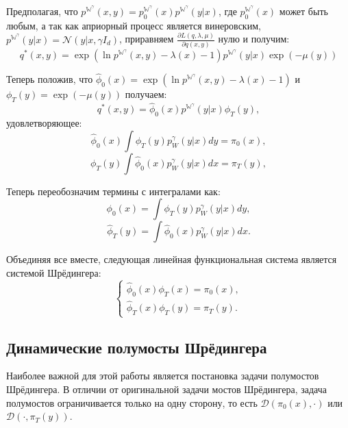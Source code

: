 Предполагая, что $p^{\mathbb{W}^\gamma}(x,y) = p_0^{\mathbb{W}^\gamma}(x)p^{\mathbb{W}^\gamma}(y|x)$, где $p_0^{\mathbb{W}^\gamma}(x)$ может быть любым, а так как априорный процесс является винеровским, $p^{\mathbb{W}^\gamma}(y|x)=\mathcal{N}(y|x, \gamma I_d)$, приравняем $\frac{\partial L(q, \lambda, \mu)}{\partial q(x,y)}$ нулю и получим:
\begin{equation*}
    q^*(x, y) = \exp{(\ln{p^{\mathbb{W}^\gamma}(x,y)} - \lambda(x) - 1)}p^{\mathbb{W}^\gamma}(y|x)\exp{(-\mu(y))}
\end{equation*}

Теперь положив, что  $\hat\phi_0(x) = \exp{(\ln{p^{\mathbb{W}^\gamma}(x,y)} - \lambda(x) - 1)}$ и $\phi_T(y) = \exp{(-\mu(y))}$ получаем:
\begin{equation*}
    q^*(x, y) = \hat\phi_0(x)p^{\mathbb{W}^\gamma}(y|x)\phi_T(y),
\end{equation*}
удовлетворяющее:
\begin{equation*}
    \hat{\phi}_0(x) \int \phi_T(y) p_W^\gamma(y|x) dy = \pi_0(x),
\end{equation*}
\begin{equation*}
    \phi_T(y) \int \hat{\phi}_0(x) p_W^\gamma(y|x) dx = \pi_T(y),
\end{equation*}

Теперь переобозначим термины с интегралами как:
\begin{equation*}
    \phi_0(x) = \int \phi_T(y) p_W^\gamma(y|x) dy,
\end{equation*}
\begin{equation*}
    \hat{\phi}_T(y) = \int \hat{\phi}_0(x) p_W^\gamma(y|x) dx.
\end{equation*}

Объединяя все вместе, следующая линейная функциональная система является системой Шрёдингера:
\begin{equation}
    \left\{ 
    \begin{array}{c}
        \hat{\phi}_0(x) \phi_T(x) = \pi_0(x), \\
        \hat{\phi}_T(x) \phi_T(y) = \pi_T(y).
    \label{sys_sb}
    \end{array}\right.
\end{equation}

\subsection{Динамические полумосты Шрёдингера}
Наиболее важной для этой работы является постановка задачи полумостов Шрёдингера. В отличии от оригинальной задачи мостов Шрёдингера, задача полумостов ограничивается только на одну сторону, то есть $\mathcal{D}(\pi_0(x), \cdot)$ или $\mathcal{D}(\cdot, \pi_T(y))$. 

